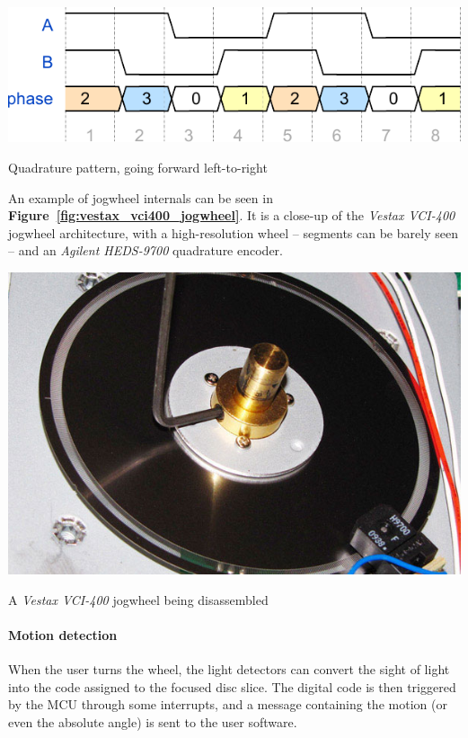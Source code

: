\documentclass[a4paper,10pt]{article}
\makeatletter
\newenvironment{figurehere}{\def\@captype{figure}\vspace{2ex}}{\vspace{2ex}}
\newcommand{\citef}[1]{\textbf{Figure~\ref{#1}}}
\makeatother
\begin{document}
\begin{multicols}{2}
\begin{figurehere}
	\centering
	\includegraphics[keepaspectratio=true,width=0.9\columnwidth]{images/quad_wave.pdf}
	\caption{Quadrature pattern, going forward left-to-right}
	\label{fig:quad_wave}
\end{figurehere}

An example of jogwheel internals can be seen in \citef{fig:vestax_vci400_jogwheel}.
It is a close-up of the \emph{Vestax VCI-400} \cite{vestax_vci400} jogwheel
architecture, with a high-resolution wheel -- segments can be barely seen --
and an \emph{Agilent HEDS-9700} quadrature encoder.

\begin{figurehere}
	\centering
	\includegraphics[keepaspectratio=true,width=0.8\columnwidth]{images/vestax_vci400_jogwheel.jpg}
	\caption{A \emph{Vestax VCI-400} jogwheel being disassembled}
	\label{fig:vestax_vci400_jogwheel}
\end{figurehere}


\paragraph{Motion detection}
When the user turns the wheel, the light detectors can convert the sight of
light into the code assigned to the focused disc slice. The digital code is
then triggered by the MCU through some interrupts, and a message containing
the motion (or even the absolute angle) is sent to the user software.



\end{multicols}
\end{document}
